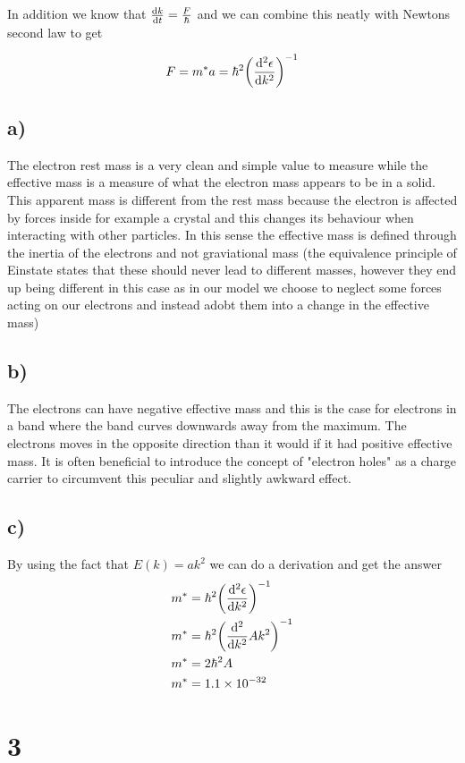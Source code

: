 \documentclass{article}
\newcommand{\bigexp}[2]{\qty(#1)^{#2}}
\begin{document}
In addition we know that $\dv{k}{t} = \frac{F}{\hbar}$ and we can combine this neatly with Newtons second law to get

\begin{align*}
	F=m^*a = \hbar^2\qty(\dv[2]{\epsilon}{k})^{-1}
\end{align*}

\subsection*{a)}
The electron rest mass is a very clean and simple value to measure while the effective mass is a measure of what the electron mass appears to be in a solid. This apparent mass is different from the rest mass because the electron is affected by forces inside for example a crystal and this changes its behaviour when interacting with other particles. In this sense the effective mass is defined through the inertia of the electrons and not graviational mass (the equivalence principle of Einstate states that these should never lead to different masses, however they end up being different in this case as in our model we choose to neglect some forces acting on our electrons and instead adobt them into a change in the effective mass)

\subsection*{b)}
The electrons can have negative effective mass and this is the case for electrons in a band where the band curves downwards away from the maximum. The electrons moves in the opposite direction than it would if it had positive effective mass. It is often beneficial to introduce the concept of "electron holes" as a charge carrier to circumvent this peculiar and slightly awkward effect.

\subsection*{c)}
By using the fact that $E(k) = ak^2$ we can do a derivation and get the answer
\begin{align*}
	m^* &= \hbar^2\bigexp{\dv[2]{\epsilon}{k}}{-1}\\
	m^*&= \hbar^2\bigexp{\dv[2]{}{k}Ak^2}{-1}\\
	m^*&= 2\hbar^2A\\
	m^*&= 1.1\times10^{-32}
\end{align*}

\newpage
\section*{3}
\end{document}
